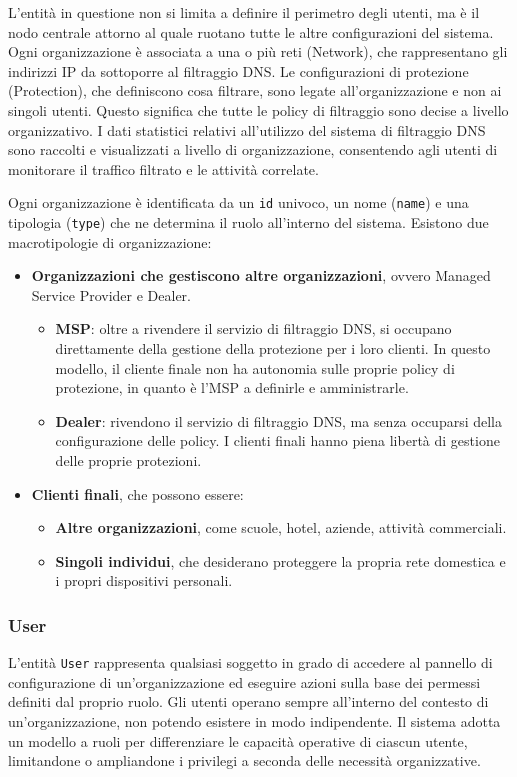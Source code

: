L'entità in questione non si limita a definire il perimetro degli utenti, ma è il nodo centrale attorno al quale ruotano tutte le altre configurazioni del sistema. Ogni organizzazione è associata a una o più reti (Network), che rappresentano gli indirizzi IP da sottoporre al filtraggio DNS. Le configurazioni di protezione (Protection), che definiscono cosa filtrare, sono legate all'organizzazione e non ai singoli utenti. Questo significa che tutte le policy di filtraggio sono decise a livello organizzativo. I dati statistici relativi all’utilizzo del sistema di filtraggio DNS sono raccolti e visualizzati a livello di organizzazione, consentendo agli utenti di monitorare il traffico filtrato e le attività correlate.

Ogni organizzazione è identificata da un \texttt{id} univoco, un nome (\texttt{name}) e una tipologia (\texttt{type}) che ne determina il ruolo all'interno del sistema. Esistono due macrotipologie di organizzazione:
\begin{itemize}
  \item \textbf{Organizzazioni che gestiscono altre organizzazioni}, ovvero Managed Service Provider e Dealer.
    \begin{itemize}
      \item \textbf{MSP}: oltre a rivendere il servizio di filtraggio DNS, si occupano direttamente della gestione della protezione per i loro clienti. In questo modello, il cliente finale non ha autonomia sulle proprie policy di protezione, in quanto è l'MSP a definirle e amministrarle.
      \item \textbf{Dealer}: rivendono il servizio di filtraggio DNS, ma senza occuparsi della configurazione delle policy. I clienti finali hanno piena libertà di gestione delle proprie protezioni.
    \end{itemize}
  \item \textbf{Clienti finali}, che possono essere:
    \begin{itemize}
      \item \textbf{Altre organizzazioni}, come scuole, hotel, aziende, attività commerciali.
      \item \textbf{Singoli individui}, che desiderano proteggere la propria rete domestica e i propri dispositivi personali.
    \end{itemize}
\end{itemize}

\subsubsection{User}
L'entità \texttt{User} rappresenta qualsiasi soggetto in grado di accedere al pannello di configurazione di un'organizzazione ed eseguire azioni sulla base dei permessi definiti dal proprio ruolo. Gli utenti operano sempre all'interno del contesto di un'organizzazione, non potendo esistere in modo indipendente. Il sistema adotta un modello a ruoli per differenziare le capacità operative di ciascun utente, limitandone o ampliandone i privilegi a seconda delle necessità organizzative.


